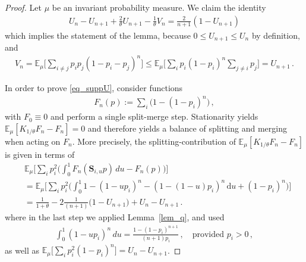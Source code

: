 \documentclass[a4paper,11pt]{article}
\newcommand{\EE}{\mathbb{E}}
\newcommand*{\ud}{\mathrm{\,d}}
\numberwithin{equation}{section}
\begin{document}
\begin{proof}
	Let $ \mu$ be an invariant probability measure.
We claim the identity
\begin{equation}\label{eq_suppU}
\begin{aligned}
U_{n}- U_{n+1}+ \frac{2}{\theta} U_{n+1}- \frac{1}{\theta} V_{n}
=
\frac{2}{n+1} (1- U_{n+1})  
\end{aligned}
\end{equation}
which implies the statement of the lemma, because $ 0 \leqslant U_{n+1} \leqslant U_{n}$  by definition, and 
\begin{equation*}
\begin{aligned}
 V_{n} =
 \EE_{\mu}\bigg[ \sum_{i \neq j } p_{i} p_{j} ( 1- p_{i}- p_{j})^{n} \bigg]
 \leqslant 
  \EE_{\mu}\bigg[ \sum_{i } p_{i} (1-p_{i})^{n} \sum_{j \neq i }p_{j}  \bigg]
=  U_{n+1}\,.
\end{aligned}
\end{equation*}

In order to prove \eqref{eq_suppU}, consider functions 
\begin{equation*}
\begin{aligned}
F_{n}(p ):= \sum_{i}\big( 1- ( 1- p_{i})^{n})\,,
\end{aligned}
\end{equation*} 
with $ F_{0}\equiv 0 $
and  perform a single split-merge step. Stationarity yields $ \EE_{\mu} [K_{1/ \theta} F_{n}- F_{n}]=0$ and therefore yields a balance of splitting and merging when acting on $ F_{n}$. More precisely, 
the splitting-contribution of $ \EE_{\mu} [K_{1/ \theta} F_{n}-F_{n}]$ is given in terms of 
\begin{equation*}
\begin{aligned}
&\EE_{\mu}\bigg[
	\sum_{i} p_{i}^{2}\bigg(
	\int_{0}^{1} F_{n}(\mathbf{S}_{i,u }p) \, du - F_{n}(p)\bigg)
\bigg]\\
&=
\EE_{\mu}\bigg[
	\sum_{i} p_{i}^{2}\Big(
	\int_{0}^{1} 
	1
	- ( 1- u p_{i})^{n}  - (1- (1-u)p_{i})^{n}
	\ud u
	+ ( 1- p_{i})^{n}\Big)
\bigg]\\
& =
\frac{1}{1+ \theta}
-  
2
\frac{1}{(n+1)}
\Big(1
-U_{n+1}\Big) 
+ U_{n}- U_{n+1}
\,.
\end{aligned}
\end{equation*}
where in the last step we applied Lemma~\ref{lem_q}, and used 
\begin{equation*}
\begin{aligned}
\int_0^1(1-up_i)^n\,du
=\frac{1-(1-p_i)^{n+1}}{(n+1)p_i}\,,\quad  \text{provided } p_i>0\,,
\end{aligned}
\end{equation*}
as well as $\mathbb E_\mu\big[\sum_i p_i^2(1-p_i)^n\big]=U_n-U_{n+1}$.


\end{proof}
\end{document}
